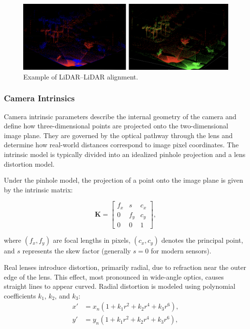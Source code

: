 \documentclass{erauthesis}
\begin{document}
\begin{figure}[htbp]
    \centering
    \includegraphics[width=0.9\linewidth]{Images/Lidar2Lidar.png}
    \caption{Example of LiDAR–LiDAR alignment.}
    \label{fig:Lidar2Lidar}
\end{figure}

\subsubsection{Camera Intrinsics} \label{camera_intrinsics}

Camera intrinsic parameters describe the internal geometry of the camera and define how three-dimensional points are projected onto the two-dimensional image plane.  
They are governed by the optical pathway through the lens and determine how real-world distances correspond to image pixel coordinates.  
The intrinsic model is typically divided into an idealized pinhole projection and a lens distortion model.

Under the pinhole model, the projection of a point onto the image plane is given by the intrinsic matrix:

\begin{equation}
    \mathbf{K} = 
    \begin{bmatrix}
        f_x & s & c_x \\
        0 & f_y & c_y \\
        0 & 0 & 1
    \end{bmatrix},
\end{equation}

where $(f_x, f_y)$ are focal lengths in pixels, $(c_x, c_y)$ denotes the principal point, and $s$ represents the skew factor (generally $s=0$ for modern sensors).

Real lenses introduce distortion, primarily radial, due to refraction near the outer edge of the lens.  
This effect, most pronounced in wide-angle optics, causes straight lines to appear curved.  
Radial distortion is modeled using polynomial coefficients $k_1$, $k_2$, and $k_3$:
\begin{equation}
    \begin{split}
        x' &= x_n(1 + k_1 r^2 + k_2 r^4 + k_3 r^6), \\
        y' &= y_n(1 + k_1 r^2 + k_2 r^4 + k_3 r^6),
    \end{split}
\end{equation}
\end{document}
